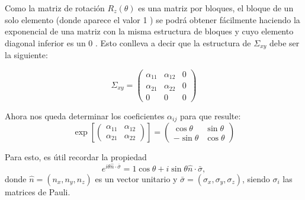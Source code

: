 Como la matriz de rotación $R_{z}(\theta)$ es una matriz por bloques, el bloque de un solo elemento (donde aparece el valor 1 ) se podrá obtener fácilmente haciendo la exponencial de una matriz con la misma estructura de bloques y cuyo elemento diagonal inferior es un 0 . Esto conlleva a  decir que la estructura de $\Sigma_{x y}$ debe ser la siguiente:

\begin{equation}
    \Sigma_{x y}=\left(\begin{array}{ccc}
\alpha_{11} & \alpha_{12} & 0 \\
\alpha_{21} & \alpha_{22} & 0 \\
0 & 0 & 0
\end{array}\right)
\end{equation}

Ahora nos queda determinar los coeficientes $\alpha_{i j}$ para que resulte:
\begin{equation}
\exp \left[\left(\begin{array}{ll}
\alpha_{11} & \alpha_{12} \\
\alpha_{21} & \alpha_{22}
\end{array}\right)\right]=\left(\begin{array}{cc}
\cos \theta & \sin \theta \\
-\sin \theta & \cos \theta
\end{array}\right)
\label{A12}
\end{equation}

Para esto, es útil recordar la propiedad
\begin{equation}
    e^{i \theta \hat{n} \cdot \bar{\sigma}}= 1 \cos \theta +i \sin \theta \hat{n} \cdot \bar{\sigma},
\end{equation}
donde $\hat{n}=\left(n_{x}, n_{y}, n_{z}\right)$ es un vector unitario y $\bar{\sigma}=\left(\sigma_{x}, \sigma_{y}, \sigma_{z}\right)$, siendo $\sigma_{i}$ las matrices de Pauli. 

